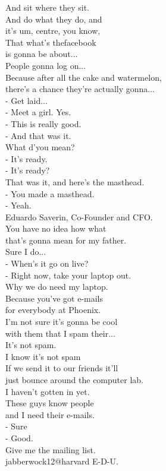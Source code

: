 \documentclass{article}
\begin{document}
\begin{multicols}{3}
And sit where they sit.\\
And do what they do, and\\
it's um, centre, you know,\\
That what's thefacebook\\
is gonna be about...\\
People gonna log on...\\
Because after all the cake and watermelon,\\
there's a chance they're actually gonna...\\
- Get laid...\\
- Meet a girl. Yes.\\
- This is really good.\\
- And that was it.\\
What d'you mean?\\
- It's ready.\\
- It's ready?\\
That was it, and here's the masthead.\\
- You made a masthead.\\
- Yeah.\\
Eduardo Saverin, Co-Founder and CFO.\\
You have no idea how what\\
that's gonna mean for my father.\\
Sure I do...\\
- When's it go on live?\\
- Right now, take your laptop out.\\
Why we do need my laptop.\\
Because you've got e-mails\\
for everybody at Phoenix.\\
I'm not sure it's gonna be cool\\
with them that I spam their...\\
It's not spam.\\
I know it's not spam\\
If we send it to our friends it'll\\
just bounce around the computer lab.\\
I haven't gotten in yet.\\
These guys know people\\
and I need their e-mails.\\
- Sure\\
- Good.\\
Give me the mailing list.\\
jabberwock12@harvard E-D-U.\\

\end{multicols}
\end{document}
